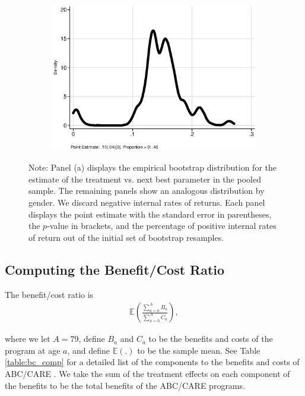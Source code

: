\begin{figure}
\begin{subfigure}[h]{0.35\textwidth}
		\includegraphics[width=\textwidth]{output/irr_2_sexm.eps}
\end{subfigure}
\footnotesize \justify
Note: Panel (a) displays the empirical bootstrap distribution for the estimate of the treatment vs. next best parameter in the pooled sample. The remaining panels show an analogous distribution by gender. We discard negative internal rates of returns. Each panel displays the point estimate with the standard error in parentheses, the $p$-value in brackets, and the percentage of positive internal rates of return out of the initial set of bootstrap resamples.
\end{figure}
\restoregeometry
\doublespacing

\subsection{Computing the Benefit/Cost Ratio}\label{app:method_cbratio}

\noindent The benefit/cost ratio is
\begin{align}
\mathbb{E} \left( \frac{ \sum_{a=0}^A B_a}{\sum_{a=0}^A C_a} \right),
\end{align}

\noindent where we let $A = 79$, define $B_a$ and $C_a$ to be the benefits and costs of the
program at age $a$, and define $\mathbb{E}(.)$ to be the sample mean. See Table \ref{table:bc_comp} for a detailed list of the components
to the benefits and costs of ABC/CARE . We take the sum of the treatment effects on each component
of the benefits to be the total benefits of the ABC/CARE programs. \\

